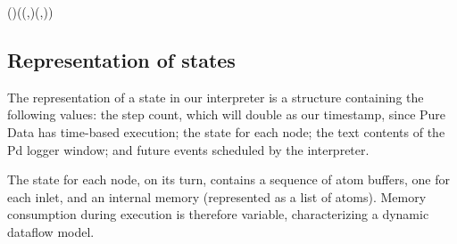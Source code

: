 \begin{hscode}\SaveRestoreHook
{}%
%
%
\>[B]{}\;(\cdot \rhd \cdot )\mathrel{=}((,)\rhd (,)){}\<[E]%
\\
\>[B]{}\<[4]%
\>[4]{}\;\<[E]%
\ColumnHook
\end{hscode}\resethooks

\subsection{Representation of states}

The representation of a state in our interpreter is a structure containing the
following values: the step count, which will double as our timestamp, since
Pure Data has time-based execution; the state for each node; the text contents
of the Pd logger window; and future events scheduled by the interpreter.

\resethooks

The state for each node, on its turn, contains a sequence of atom buffers,
one for each inlet, and an internal memory (represented as a list of atoms).
Memory consumption during execution is therefore variable, characterizing
a dynamic dataflow model.

